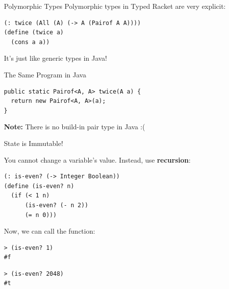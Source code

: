 \documentclass{beamer}
\begin{document}
\begin{frame}[fragile]{Polymorphic Types}
Polymorphic types in Typed Racket are very explicit:

\begin{lstlisting}
(: twice (All (A) (-> A (Pairof A A))))
(define (twice a)
  (cons a a))
\end{lstlisting}

\pause{}

\vspace{0.5cm}


\vspace{1cm}

\pause{}

It's just like generic types in Java!
\end{frame}

\begin{frame}[fragile]{The Same Program in Java}
\begin{lstlisting}[style=Java]
public static Pairof<A, A> twice(A a) {
  return new Pairof<A, A>(a);
}
\end{lstlisting}

\vspace{1.5cm}

\textbf{Note:} There is no build-in pair type in Java :(
\end{frame}

\begin{frame}[fragile]{State is Immutable!}

You cannot change a variable's value. Instead, use \textbf{recursion}:

\begin{lstlisting}
(: is-even? (-> Integer Boolean))
(define (is-even? n)
  (if (< 1 n)
      (is-even? (- n 2))
      (= n 0)))
\end{lstlisting}

\pause{}

Now, we can call the function:

\begin{lstlisting}
> (is-even? 1)
#f
\end{lstlisting}
\pause{}
\begin{lstlisting}
> (is-even? 2048)
#t
\end{lstlisting}
\end{frame}
\end{document}
